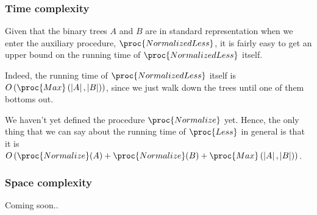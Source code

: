 \subsubsection{Time complexity}

Given that the binary trees $A$ and $B$ are in standard representation when we
enter the auxiliary procedure, $\proc{NormalizedLess}$, it is fairly easy to
get an upper bound on the running time of $\proc{NormalizedLess}$ itself.

Indeed, the running time of $\proc{NormalizedLess}$ itself is
$O\left(\proc{Max}\left(\left|A\right|,\left|B\right|\right)\right)$, since we
just walk down the trees until one of them bottoms out. 

We haven't yet defined the procedure $\proc{Normalize}$ yet. Hence, the only
thing that we can say about the running time of $\proc{Less}$ in general is
that it is $O\left(\proc{Normalize}(A) + \proc{Normalize}(B) +
\proc{Max}\left(\left|A\right|,\left|B\right|\right) \right)$.

\subsubsection{Space complexity}

Coming soon..
